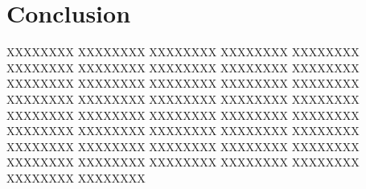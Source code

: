 \documentclass[journal]{IEEEtran}
\begin{document}
\section{Conclusion}

XXXXXXXX XXXXXXXX XXXXXXXX XXXXXXXX XXXXXXXX XXXXXXXX 
XXXXXXXX XXXXXXXX XXXXXXXX XXXXXXXX XXXXXXXX XXXXXXXX 
XXXXXXXX XXXXXXXX XXXXXXXX XXXXXXXX XXXXXXXX XXXXXXXX 
XXXXXXXX XXXXXXXX XXXXXXXX XXXXXXXX XXXXXXXX XXXXXXXX 
XXXXXXXX XXXXXXXX XXXXXXXX XXXXXXXX XXXXXXXX XXXXXXXX 
XXXXXXXX XXXXXXXX XXXXXXXX XXXXXXXX XXXXXXXX XXXXXXXX 
XXXXXXXX XXXXXXXX XXXXXXXX XXXXXXXX XXXXXXXX XXXXXXXX 



 
\end{document}
